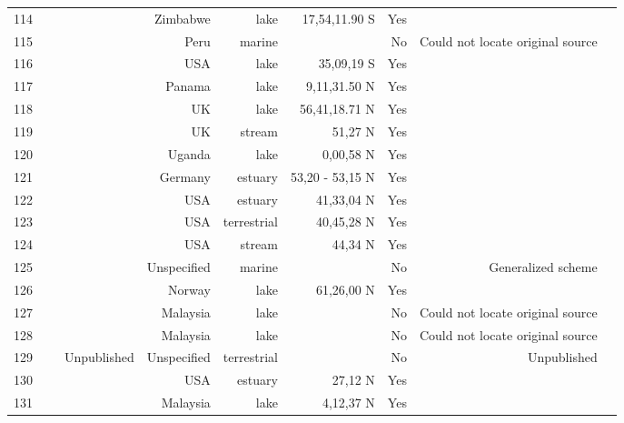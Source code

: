 \documentclass[12pt]{article}
\begin{document}
\begin{landscape}
\begin{table}[h!]
\begin{tabular}{rrrrrrrrr}
      114   & ~\citet{GlobalWeb} & ~\citet{Marshall1982} & Zimbabwe & lake  & 17,54,11.90 S & Yes   &       &  \\
      115   & ~\citet{GlobalWeb} & ~\citet{Koepcke1952} & Peru} & marine &       & No    & Could not locate original source &  \\
      116   & ~\citet{GlobalWeb} & ~\citet{Hurlbert1972} & USA & lake  & 35,09,19 S & Yes   &       &  \\
      117   & ~\citet{GlobalWeb} & ~\citet{Zaret1973} & Panama & lake  & 9,11,31.50 N & Yes   &       &  \\
      118   & ~\citet{GlobalWeb} & ~\citet{Bindloss1972} & UK & lake  & 56,41,18.71 N & Yes   &       &  \\
      119   & ~\citet{GlobalWeb} & ~\citet{Mann1972} & UK & stream & 51,27 N & Yes   &       &  \\
      120   & ~\citet{GlobalWeb} & ~\citet{Moriarty1973} & Uganda & lake  & 0,00,58 N & Yes   &       &  \\
      121   & ~\citet{GlobalWeb} & ~\citet{VanEs1977} & Germany & estuary & 53,20 - 53,15 N & Yes   &       &  \\
      122   & ~\citet{GlobalWeb} & ~\citet{Nixon1973} & USA & estuary & 41,33,04 N & Yes   &       &  \\
      123   & ~\citet{GlobalWeb} & ~\citet{Harris1972} & USA & terrestrial & 40,45,28 N & Yes   &       &  \\
      124   & ~\citet{GlobalWeb} & ~\citet{Collins1976} & USA & stream & 44,34 N & Yes   &       &  \\
      125   & ~\citet{GlobalWeb} & ~\citet{Landry1977} & Unspecified & marine &       & No    & Generalized scheme &  \\
      126   & ~\citet{GlobalWeb} & ~\citet{Larsson1978} & Norway & lake  & 61,26,00 N & Yes   &       &  \\
      127   & ~\citet{GlobalWeb} & ~\citet{Beaver1979} & Malaysia & lake  &       & No    & Could not locate original source &  \\
      128   & ~\citet{GlobalWeb} & ~\citet{Beaver1979} & Malaysia & lake  &       & No    & Could not locate original source &  \\
      129   & ~\citet{GlobalWeb} & Unpublished & Unspecified & terrestrial &       & No    & Unpublished &  \\
      130   & ~\citet{GlobalWeb} & ~\citet{Odum1975} & USA & estuary & 27,12 N & Yes   &       &  \\
      131   & ~\citet{GlobalWeb} & ~\citet{Beaver1985} & Malaysia & lake  & 4,12,37 N & Yes   &       &  \\

\end{tabular}
\end{table}
\end{landscape}
\end{document}
